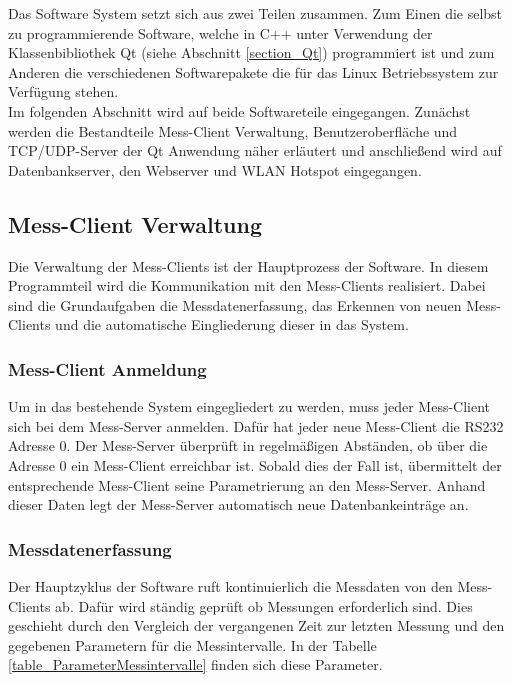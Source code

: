 Das Software System setzt sich aus zwei Teilen zusammen. Zum Einen die selbst zu programmierende Software, welche in C++ unter Verwendung der Klassenbibliothek Qt (siehe Abschnitt \ref{section_Qt}) programmiert ist und zum Anderen die verschiedenen Softwarepakete die für das Linux Betriebssystem zur Verfügung stehen.\\
Im folgenden Abschnitt wird auf beide Softwareteile eingegangen. Zunächst werden die Bestandteile Mess-Client Verwaltung, Benutzeroberfläche und TCP/UDP-Server der Qt Anwendung näher erläutert und anschließend wird auf Datenbankserver, den Webserver und WLAN Hotspot eingegangen.

\subsection{Mess-Client Verwaltung}
\label{section_messclientverwaltung}
Die Verwaltung der Mess-Clients ist der Hauptprozess der Software. In diesem Programmteil wird die Kommunikation mit den Mess-Clients realisiert. Dabei sind die Grundaufgaben die Messdatenerfassung, das Erkennen von neuen Mess-Clients und die automatische Eingliederung dieser in das System.

\subsubsection{Mess-Client Anmeldung}
Um in das bestehende System eingegliedert zu werden, muss jeder Mess-Client sich bei dem Mess-Server anmelden. Dafür hat jeder neue Mess-Client die RS232 Adresse 0. Der Mess-Server überprüft in regelmäßigen Abständen, ob über die Adresse 0 ein Mess-Client erreichbar ist. Sobald dies der Fall ist, übermittelt der entsprechende Mess-Client seine Parametrierung an den Mess-Server. Anhand dieser Daten legt der Mess-Server automatisch neue Datenbankeinträge an.

\subsubsection{Messdatenerfassung}

Der Hauptzyklus der Software ruft kontinuierlich die Messdaten von den Mess-Clients ab. Dafür wird ständig geprüft ob Messungen erforderlich sind. Dies geschieht durch den Vergleich der vergangenen Zeit zur letzten Messung und den gegebenen Parametern für die Messintervalle. In der Tabelle \ref{table_ParameterMessintervalle} finden sich diese Parameter.\\


